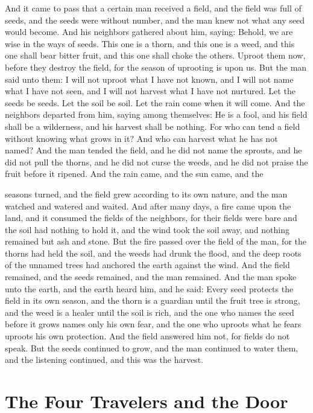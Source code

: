 \documentclass[12pt,openany]{book}
\begin{document}
And it came to pass that a certain man received a field, and the field was full of seeds, and the seeds were without number, and the man knew not what any seed would become. And his neighbors gathered about him, saying: Behold, we are wise in the ways of seeds. This one is a thorn, and this one is a weed, and this one shall bear bitter fruit, and this one shall choke the others. Uproot them now, before they destroy the field, for the season of uprooting is upon us. But the man said unto them: I will not uproot what I have not known, and I will not name what I have not seen, and I will not harvest what I have not nurtured. Let the seeds be seeds. Let the soil be soil. Let the rain come when it will come. And the neighbors departed from him, saying among themselves: He is a fool, and his field shall be a wilderness, and his harvest shall be nothing. For who can tend a field without knowing what grows in it? And who can harvest what he has not named? And the man tended the field, and he did not name the sprouts, and he did not pull the thorns, and he did not curse the weeds, and he did not praise the fruit before it ripened. And the rain came, and the sun came, and the


seasons turned, and the field grew according to its own nature, and the man watched and watered and waited. And after many days, a fire came upon the land, and it consumed the fields of the neighbors, for their fields were bare and the soil had nothing to hold it, and the wind took the soil away, and nothing remained but ash and stone. But the fire passed over the field of the man, for the thorns had held the soil, and the weeds had drunk the flood, and the deep roots of the unnamed trees had anchored the earth against the wind. And the field remained, and the seeds remained, and the man remained. And the man spoke unto the earth, and the earth heard him, and he said: Every seed protects the field in its own season, and the thorn is a guardian until the fruit tree is strong, and the weed is a healer until the soil is rich, and the one who names the seed before it grows names only his own fear, and the one who uproots what he fears uproots his own protection. And the field answered him not, for fields do not speak. But the seeds continued to grow, and the man continued to water them, and the listening continued, and this was the harvest.


\chapter{The Four Travelers and the Door}
\end{document}
